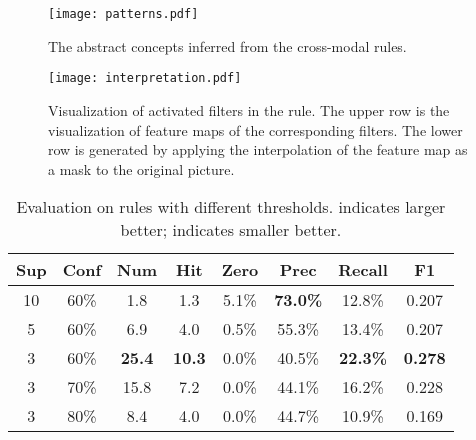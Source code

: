 \documentclass[sigconf]{acmart}
\begin{document}
\begin{figure*}[t] 
\centering 
\centerline{\texttt{[image: patterns.pdf]}} 
\caption{The abstract concepts inferred from the cross-modal rules.} 
\label{figure4}
\end{figure*}

\begin{figure*}[t] 
\centering 
\centerline{\texttt{[image: interpretation.pdf]}} 
\caption{Visualization of activated filters in the rule. The upper row is the visualization of feature maps of the corresponding filters. The lower row is generated by applying the interpolation of the feature map as a mask to the original picture.} 
\label{figure5}
\end{figure*}

\begin{table}[t]
\centering
\caption{Evaluation on rules with different thresholds.  indicates larger better;  indicates smaller better.}
\begin{tabular}{cccccccc}
\toprule
Sup&Conf&Num&Hit&Zero&Prec&Recall&F1\\
\midrule
10&60\%&1.8&1.3&5.1\%&\textbf{73.0\%}&12.8\%&0.207\\
5&60\%&6.9&4.0&0.5\%&55.3\%&13.4\%&0.207\\
3&60\%&\textbf{25.4}&\textbf{10.3}&0.0\%&40.5\%&\textbf{22.3\%}&\textbf{0.278}\\
3&70\%&15.8&7.2&0.0\%&44.1\%&16.2\%&0.228\\
3&80\%&8.4&4.0&0.0\%&44.7\%&10.9\%&0.169\\
\bottomrule
\end{tabular}
\setlength{\belowcaptionskip}{10pt}
\label{table1}
\end{table}
\end{document}
